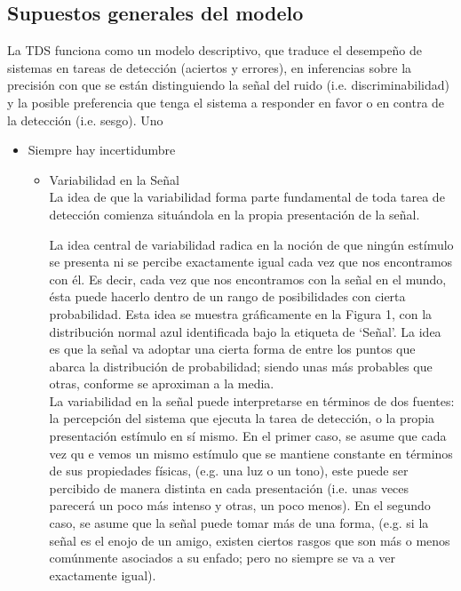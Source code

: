 \subsection{Supuestos generales del modelo}

La TDS funciona como un modelo descriptivo, que traduce el desempeño de sistemas en tareas de detección (aciertos y errores), en inferencias sobre la precisión con que se están distinguiendo la señal del ruido (i.e. discriminabilidad) y la posible preferencia que tenga el sistema a responder en favor o en contra de la detección (i.e. sesgo). Uno \\

\begin{itemize}
  \item{Siempre hay incertidumbre}


    \begin{itemize}
      \item{Variabilidad en la Señal}\\

%

La idea de que la variabilidad forma parte fundamental de toda tarea de detección comienza situándola en la propia presentación de la señal. 

La idea central de variabilidad radica en la noción de que ningún estímulo se presenta ni se percibe exactamente igual cada vez que nos encontramos con él.  Es decir, cada vez que nos encontramos con la  señal en el mundo, ésta puede hacerlo dentro de un rango de posibilidades con cierta probabilidad. Esta idea se muestra gráficamente en la Figura 1, con la distribución normal azul identificada bajo la etiqueta de ‘Señal’. La idea es que la señal va adoptar una cierta forma de entre los puntos que abarca la distribución de probabilidad; siendo unas más probables que otras, conforme se aproximan a la media.\\

La variabilidad en la señal puede interpretarse en términos de dos fuentes: la percepción del sistema que ejecuta la tarea de detección, o la propia presentación estímulo en sí mismo. En el primer caso, se asume que cada vez qu e vemos un mismo estímulo que se mantiene constante en términos de sus propiedades físicas,  (e.g. una luz o un tono),  este puede ser percibido de manera distinta en cada presentación (i.e. unas veces parecerá un poco más intenso y otras, un poco menos). En el segundo caso, se asume que la señal puede tomar más de una forma, (e.g. si la señal es el enojo de un amigo, existen ciertos rasgos que son más o menos comúnmente asociados a su enfado; pero no siempre se va a ver exactamente igual).\\


\end{itemize}
\end{itemize}
